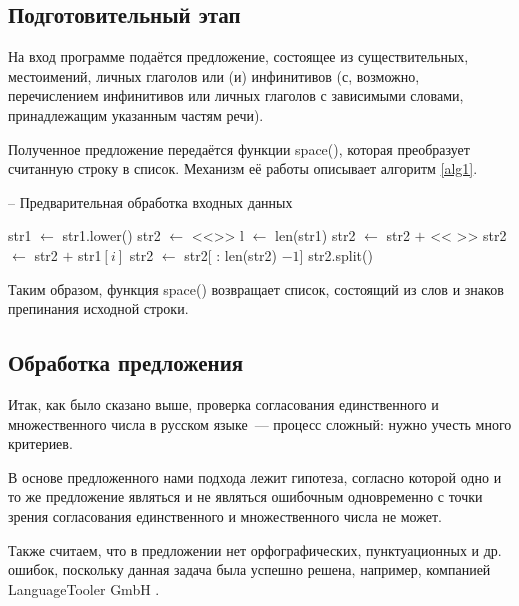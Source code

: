 \documentclass[main]{subfiles}
\begin{document}
\subsection{Подготовительный этап}
На вход программе подаётся предложение, состоящее из существительных, местоимений, личных глаголов или (и) инфинитивов (с, возможно, перечислением инфинитивов или личных глаголов с зависимыми словами, принадлежащим указанным частям речи). 

Полученное предложение передаётся функции space(), которая преобразует считанную строку в список. Механизм её работы описывает алгоритм \ref{alg1}.

\begin{algorithm}
	\caption{-- Предварительная обработка входных данных}\label{alg1}
	\begin{algorithmic}[1]
		\State str1 $\gets$ str1.lower() 
		\State str2 $\gets $ <<>> 
		\State l $\gets$ len(str1)
		\State str2 $\gets$ str2 $+$ << >>
		\EndIf
		\State str2 $\gets$ str2 $+$ str1$[i]$
		\EndFor
		 
		\State str2 $\gets$ str2[ : len(str2) $- 1$] 
		\EndIf
		\State\Return str2.split() 
		\EndFunction
	\end{algorithmic}
\end{algorithm}

Таким образом, функция space() возвращает список, состоящий из слов и знаков препинания исходной строки.

\subsection{Обработка предложения}

Итак, как было сказано выше, проверка согласования единственного и множественного числа в русском языке~--- процесс сложный: нужно учесть много критериев. 

В основе предложенного нами подхода лежит гипотеза, согласно которой одно и то же предложение являться и не являться ошибочным одновременно с точки зрения согласования единственного и множественного числа не может. 

Также считаем, что в предложении нет орфографических, пунктуационных и др. ошибок, поскольку данная задача была успешно решена, например, компанией LanguageTooler GmbH \cite{langt}.
\end{document}
